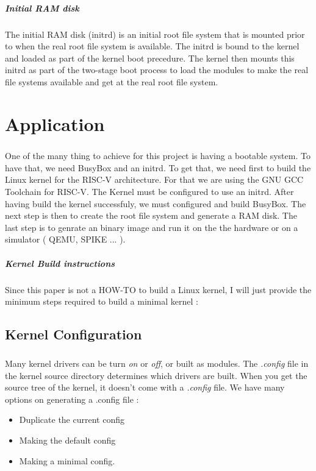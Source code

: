 \documentclass[a4paper,11pt]{report}
\begin{document}
\paragraph{Initial RAM disk}
The initial RAM disk (initrd) is an initial root file system that is mounted
prior to when the real root file system is available. The initrd is bound to the kernel and loaded as part of the kernel boot precedure. The kernel then mounts
this initrd as part of the two-stage boot process to load the modules to make the real file systems available and get at the real root file system.

\chapter{Application}

\paragraph{}
One of the many thing to achieve for this project is having a bootable system.
To have that, we need BusyBox and an initrd.
To get that, we need first to build the Linux kernel for the RISC-V architecture.
For that we are using the GNU GCC Toolchain for RISC-V. The Kernel must be
configured to use an initrd. After having build the kernel successfuly, we must 
configured and build BusyBox.
The next step is then to create the root file system and generate a RAM disk.
The last step is to genrate an binary image and run it on the the hardware or on
a simulator ( QEMU, SPIKE ... ).

\paragraph{Kernel Build instructions} 
Since this paper is not a HOW-TO to build a Linux kernel, I will just
provide the minimum  steps required to build a minimal kernel :
\section{Kernel Configuration}
\paragraph{}
Many kernel drivers can be turn \textit{on} or \textit{off}, or built as modules. The \textit{.config} file 
in the kernel source directory determines which drivers are built. When you get
the source tree of the kernel, it doesn't come with a \textit{.config} file. 
We have many options on generating a .config file :
\begin{itemize}
  \item Duplicate the current config
  \item Making the default config
  \item Making a minimal config.
\end{itemize}
\end{document}
